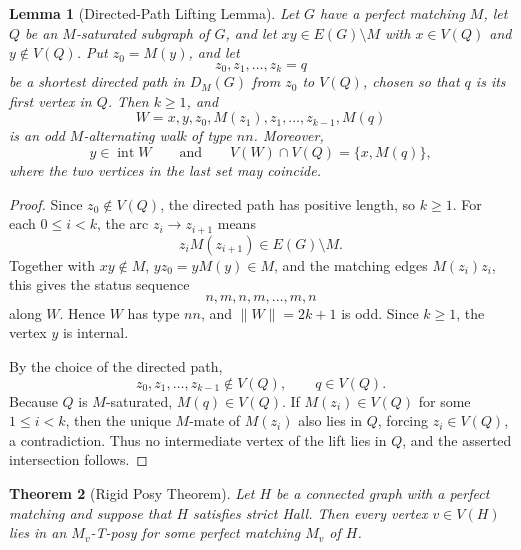 \documentclass[preprint,12pt]{elsarticle}
\theoremstyle{plain}
\newtheorem{theorem}{Theorem}[section]
\newtheorem{lemma}[theorem]{Lemma}
\begin{document}
\begin{lemma}[Directed-Path Lifting Lemma]
\label{lem_directed_path_lifting}
Let \(G\) have a perfect matching \(M\), let \(Q\) be an
\(M\)-saturated subgraph of \(G\), and let
\(xy\in E(G)\setminus M\) with \(x\in V(Q)\) and \(y\notin V(Q)\).
Put \(z_0=M(y)\), and let
\[
z_0,z_1,\ldots,z_k=q
\]
be a shortest directed path in \(D_M(G)\) from \(z_0\) to \(V(Q)\),
chosen so that \(q\) is its first vertex in \(Q\). Then \(k\geq1\), and
\[
W=x,y,z_0,M(z_1),z_1,\ldots,z_{k-1},M(q)
\]
is an odd \(M\)-alternating walk of type \(nn\). Moreover,
\[
y\in\operatorname{int}W
\qquad\text{and}\qquad
V(W)\cap V(Q)=\{x,M(q)\},
\]
where the two vertices in the last set may coincide.
\end{lemma}

\begin{proof}
Since \(z_0\notin V(Q)\), the directed path has positive length, so
\(k\geq1\). For each \(0\leq i<k\), the arc \(z_i\to z_{i+1}\) means
\[
z_iM(z_{i+1})\in E(G)\setminus M.
\]
Together with \(xy\notin M\), \(yz_0=yM(y)\in M\), and the matching
edges \(M(z_i)z_i\), this gives the status sequence
\[
n,m,n,m,\ldots,m,n
\]
along \(W\). Hence \(W\) has type \(nn\), and
\(\|W\|=2k+1\) is odd. Since \(k\geq1\), the vertex \(y\) is internal.

By the choice of the directed path,
\[
z_0,z_1,\ldots,z_{k-1}\notin V(Q),
\qquad q\in V(Q).
\]
Because \(Q\) is \(M\)-saturated, \(M(q)\in V(Q)\). If
\(M(z_i)\in V(Q)\) for some \(1\leq i<k\), then the unique
\(M\)-mate of \(M(z_i)\) also lies in \(Q\), forcing
\(z_i\in V(Q)\), a contradiction. Thus no intermediate vertex of the
lift lies in \(Q\), and the asserted intersection follows.
\end{proof}

\begin{theorem}[Rigid Posy Theorem]\label{thm_marked_strict_hall}
Let \(H\) be a connected graph with a perfect matching and suppose that
\(H\) satisfies strict Hall. Then every vertex \(v\in V(H)\) lies in an
\(M_v\)-T-posy for some perfect matching \(M_v\) of \(H\).
\end{theorem}
\end{document}
